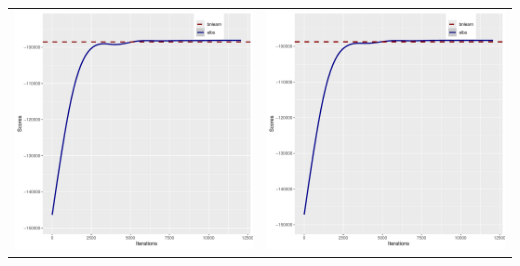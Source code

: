 \documentclass[]{scrartcl}
\begin{document}
\begin{tabular}{cc}
\includegraphics[scale = 0.4]{./figs/hepar2/mapEvolution-3-12077.pdf} &
\includegraphics[scale = 0.4]{./figs/hepar2/mapEvolution-4-12077.pdf} \\
\end{tabular}
\end{document}
